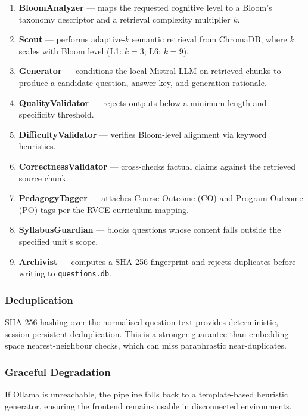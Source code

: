 \documentclass[conference]{IEEEtran}
\begin{document}
\begin{enumerate}
    \item \textbf{BloomAnalyzer} — maps the requested cognitive level to a Bloom's taxonomy descriptor and a retrieval complexity multiplier $k$.
    \item \textbf{Scout} — performs adaptive-$k$ semantic retrieval from ChromaDB, where $k$ scales with Bloom level (L1: $k=3$; L6: $k=9$).
    \item \textbf{Generator} — conditions the local Mistral LLM on retrieved chunks to produce a candidate question, answer key, and generation rationale.
    \item \textbf{QualityValidator} — rejects outputs below a minimum length and specificity threshold.
    \item \textbf{DifficultyValidator} — verifies Bloom-level alignment via keyword heuristics.
    \item \textbf{CorrectnessValidator} — cross-checks factual claims against the retrieved source chunk.
    \item \textbf{PedagogyTagger} — attaches Course Outcome (CO) and Program Outcome (PO) tags per the RVCE curriculum mapping.
    \item \textbf{SyllabusGuardian} — blocks questions whose content falls outside the specified unit's scope.
    \item \textbf{Archivist} — computes a SHA-256 fingerprint and rejects duplicates before writing to \texttt{questions.db}.
\end{enumerate}

\subsubsection{Deduplication}

SHA-256 hashing over the normalised question text provides deterministic, session-persistent deduplication. This is a stronger guarantee than embedding-space nearest-neighbour checks, which can miss paraphrastic near-duplicates.

\subsubsection{Graceful Degradation}

If Ollama is unreachable, the pipeline falls back to a template-based heuristic generator, ensuring the frontend remains usable in disconnected environments.
\end{document}

